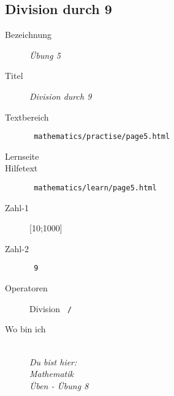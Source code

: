 \subsection{ Division durch 9 }
\label{cha:math-practise-page8}
\begin{description}
  \item[Bezeichnung] \emph{ Übung 5 }
  \item[Titel] \emph{ Division durch 9 }
  \item[Textbereich] \texttt{ mathematics/practise/page5.html }
  \item[Lernseite] 
  \item[Hilfetext] \texttt{ mathematics/learn/page5.html }
  \item[Zahl-1] [10;1000]
  \item[Zahl-2] \texttt{ 9 }
  \item[Operatoren] Division \texttt{ / }
  \item[Wo bin ich] \emph{\\Du bist hier:\\Mathematik\\Üben - Übung 8}
\end{description}
